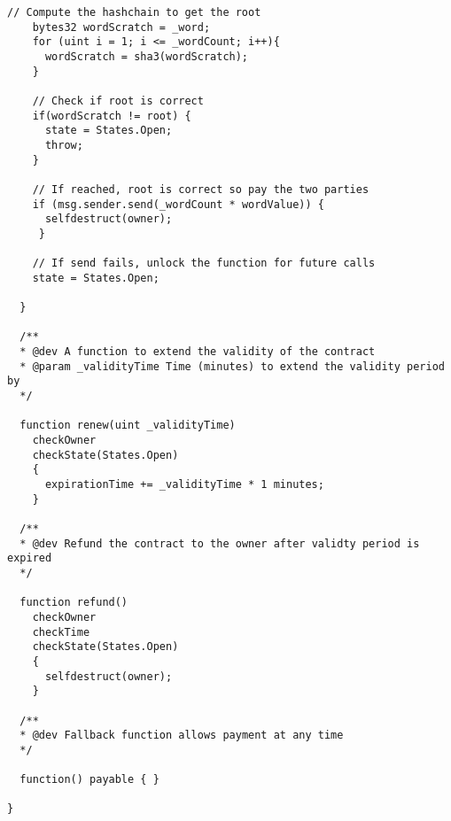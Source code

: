 \begin{lstlisting}[basicstyle=\scriptsize\ttfamily]
    // Compute the hashchain to get the root
    bytes32 wordScratch = _word;
    for (uint i = 1; i <= _wordCount; i++){
      wordScratch = sha3(wordScratch);
    }

    // Check if root is correct
    if(wordScratch != root) {
      state = States.Open;
      throw;
    }

    // If reached, root is correct so pay the two parties
    if (msg.sender.send(_wordCount * wordValue)) {
      selfdestruct(owner);
     }

    // If send fails, unlock the function for future calls
    state = States.Open;

  }

  /**
  * @dev A function to extend the validity of the contract
  * @param _validityTime Time (minutes) to extend the validity period by
  */

  function renew(uint _validityTime)
    checkOwner
    checkState(States.Open)
    {
      expirationTime += _validityTime * 1 minutes;
    }

  /**
  * @dev Refund the contract to the owner after validty period is expired
  */

  function refund()
    checkOwner
    checkTime
    checkState(States.Open)
    {
      selfdestruct(owner);
    }

  /**
  * @dev Fallback function allows payment at any time
  */

  function() payable { }

}
\end{lstlisting}














